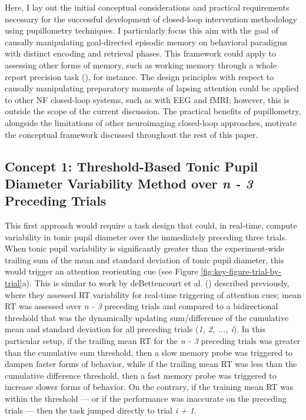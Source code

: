 Here, I lay out the initial conceptual considerations and practical requirements necessary for the successful development of closed-loop intervention methodology using pupillometry techniques. I particularly focus this aim with the goal of causally manipulating goal-directed episodic memory on behavioral paradigms with distinct encoding and retrieval phases. This framework could apply to assessing other forms of memory, such as working memory through a whole report precision task (\cite{adam2017clear}), for instance. The design principles with respect to causally manipulating preparatory moments of lapsing attention could be applied to other NF closed-loop systems, such as with EEG and fMRI; however, this is outside the scope of the current discussion. The practical benefits of pupillometry, alongside the limitations of other neuroimaging closed-loop approaches, motivate the conceptual framework discussed throughout the rest of this paper.

\subsection{Concept 1: Threshold-Based Tonic Pupil Diameter Variability Method over \emph{n - 3} Preceding Trials}
\label{section:concept-1}
This first approach would require a task design that could, in real-time, compute variability in tonic pupil diameter over the immediately preceding three trials. When tonic pupil variability is significantly greater than the experiment-wide trailing sum of the mean and standard deviation of tonic pupil diameter, this would trigger an attention reorienting cue (see Figure \ref{fig:key-figure-trial-by-trial}a). This is similar to work by deBettencourt et al. (\cite*{debettencourt2019real}) described previously, where they assessed RT variability for real-time triggering of attention cues; mean RT was assessed over \emph{n - 3} preceding trials and compared to a bidirectional threshold that was the dynamically updating sum/difference of the cumulative mean and standard deviation for all preceding trials (\emph{1, 2, ..., i}). In this particular setup, if the trailing mean RT for the \emph{n - 3} preceding trials was greater than the cumulative sum threshold, then a slow memory probe was triggered to dampen faster forms of behavior, while if the trailing mean RT was less than the cumulative difference threshold, then a fast memory probe was triggered to increase slower forms of behavior. On the contrary, if the training mean RT was within the threshold --- or if the performance was inaccurate on the preceding trials --- then the task jumped directly to trial \emph{i + 1}.

